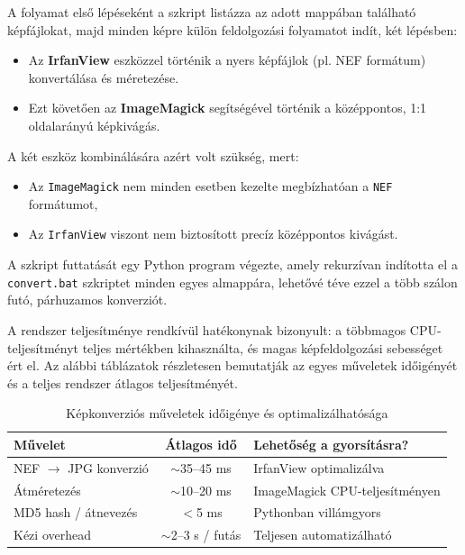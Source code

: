 \documentclass[	
  noindent
]{elteikthesis}[2024/04/26]
\begin{document}
      A folyamat első lépéseként a szkript listázza az adott mappában található képfájlokat, majd minden képre külön feldolgozási folyamatot indít, két lépésben:
      
      \begin{itemize}
        \item Az \textbf{IrfanView} eszközzel történik a nyers képfájlok (pl. NEF formátum) konvertálása és méretezése.
        \item Ezt követően az \textbf{ImageMagick} segítségével történik a középpontos, 1:1 oldalarányú képkivágás.
      \end{itemize}
      
      A két eszköz kombinálására azért volt szükség, mert:
      \begin{itemize}
        \item Az \texttt{ImageMagick} nem minden esetben kezelte megbízhatóan a \texttt{NEF} formátumot,
        \item Az \texttt{IrfanView} viszont nem biztosított precíz középpontos kivágást.
      \end{itemize}
      
      A szkript futtatását egy Python program végezte, amely rekurzívan indította el a \texttt{convert.bat} szkriptet minden egyes almappára, lehetővé téve ezzel a több szálon futó, párhuzamos konverziót.
      
      A rendszer teljesítménye rendkívül hatékonynak bizonyult: a többmagos CPU-teljesítményt teljes mértékben kihasználta, és magas képfeldolgozási sebességet ért el. Az alábbi táblázatok részletesen bemutatják az egyes műveletek időigényét és a teljes rendszer átlagos teljesítményét.
      
      \vspace{1em}
      \begin{table}[H]
      \centering
      \caption{Képkonverziós műveletek időigénye és optimalizálhatósága}
      \begin{tabular}{|l|c|l|}
      \hline
      \textbf{Művelet} & \textbf{Átlagos idő} & \textbf{Lehetőség a gyorsításra?} \\
      \hline
      NEF $\rightarrow$ JPG konverzió & $\sim$35–45 ms & IrfanView optimalizálva \\
      Átméretezés & $\sim$10–20 ms & ImageMagick CPU-teljesítményen \\
      MD5 hash / átnevezés & $<$5 ms & Pythonban villámgyors \\
      Kézi overhead & $\sim$2–3 s / futás & Teljesen automatizálható \\
      \hline
      \end{tabular}
      \end{table}
      
\end{document}
